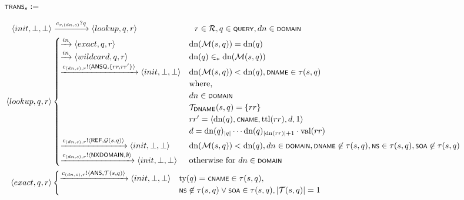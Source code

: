 \documentclass[english,acmsmall, screen, nonacm]{acmart}
\theoremstyle{plain}
\theoremstyle{definition}
\theoremstyle{remark}
\begin{document}
\begin{figure}[h]
	$\scrsf{trans}_{s}:=$
	
	\begin{gather}
		\begin{align*}
			\tup{init,\bot,\bot} & \xrightarrow{c_{r,(dn,s)}?q}\tup{lookup,q,r}\thinspace\thinspace\thinspace\thinspace\thinspace\thinspace\thinspace\thinspace\thinspace\thinspace\thinspace\thinspace\thinspace\thinspace\thinspace\thinspace\thinspace\thinspace\thinspace\thinspace\thinspace\thinspace\thinspace\thinspace\thinspace\thinspace\thinspace\thinspace\thinspace\thinspace\thinspace\thinspace\thinspace\thinspace\thinspace\thinspace\thinspace\thinspace\thinspace\thinspace\thinspace\thinspace r\in\mathcal{R},q\in\scrsf{query},dn\in\scrsf{domain}\\
			\tup{lookup,q,r} & \begin{cases}
				\xrightarrow{in}\tup{exact,q,r} & \text{dn}({\cal M}(s,q))=\text{dn}(q)\\
				\xrightarrow{in}\tup{wildcard,q,r} & \text{dn}(q)\in_{*}\text{dn}({\cal M}(s,q))\\
				\xrightarrow{c_{(dn,s),r}!\tup{\scrsf{ansq},\{rr,rr'\}}}\tup{init,\bot,\bot} & \text{dn}({\cal M}(s,q))<\text{dn}(q),\scrsf{dname}\in\tau(s,q)\\
				& \text{where, }\\
				& dn\in\scrsf{domain}\\
				& {\cal T}_{\scrsf{dname}}(s,q)=\{rr\}\\
				& rr'=\tup{\text{dn}(q),\scrsf{cname},\text{ttl}(rr),d,1}\\
				& d=\text{dn}(q)_{|q|}\cdots\text{dn}(q)_{|\text{dn}(rr)|+1}\cdot\text{val}(rr)\\
				\xrightarrow{c_{(dn,s),r}!\tup{\scrsf{ref},{\cal G}(s,q)}}\tup{init,\bot,\bot} & \text{dn}({\cal M}(s,q))<\text{dn}(q),dn\in\scrsf{domain},\scrsf{dname}\not\in\tau(s,q),\scrsf{ns}\in\tau(s,q),\scrsf{soa}\not\in\tau(s,q)\\
				\xrightarrow{c_{(dn,s),r}!\tup{\scrsf{nxdomain},\emptyset}}\tup{init,\bot,\bot} & \text{otherwise for }dn\in\scrsf{domain}
			\end{cases}\\
			\tup{exact,q,r} & \begin{cases}
				\xrightarrow{c_{(dn,s),r}!\tup{\scrsf{ans},{\cal T}(s,q)}}\tup{init,\bot,\bot} & \text{ty}(q)=\scrsf{cname}\in\tau(s,q),\\
				& \scrsf{ns}\not\in\tau(s,q)\vee\scrsf{soa}\in\tau(s,q),|{\cal T}(s,q)|=1\\

\end{cases}
\end{align*}
\end{gather}
\end{figure}
\end{document}
